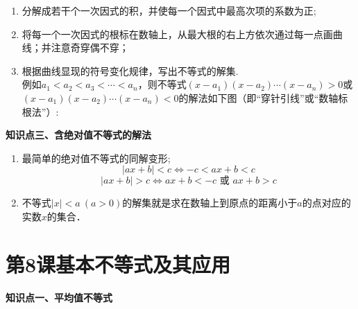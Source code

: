 \documentclass[10pt,a4paper]{ctexbook}
\begin{document}
\begin{enumerate}
    \item 分解成若干个一次因式的积，并使每一个因式中最高次项的系数为正;
    \item 将每一个一次因式的根标在数轴上，从最大根的右上方依次通过每一点画曲线；并注意奇穿偶不穿；
    \item 根据曲线显现的符号变化规律，写出不等式的解集.\\ 
    例如$a_1<a_2<a_3<\cdots <a_n$，则不等式$(x-a_1)(x-a_2)\cdots(x-a_n)>0$或$(x-a_1)(x-a_2)\cdots(x-a_n)<0$的解法如下图（即“穿针引线”或“数轴标根法”）:\par
    \begin{center}
\end{center}

\end{enumerate}

\begin{formal}
    {\large \textbf{知识点三、含绝对值不等式的解法}}
\end{formal}

\begin{enumerate}
    \item 最简单的绝对值不等式的同解变形;
    $$
    |ax+b|<c \Leftrightarrow -c<ax+b<c 
    $$
    $$
    |ax+b|>c \Leftrightarrow ax+b<-c \text{\  或 \ }  ax+b>c
    $$
    \item 不等式$ |x|<a\ (a>0)$的解集就是求在数轴上到原点的距离小于$a$的点对应的实数$x$的集合．

\end{enumerate}
\clearpage
\section{第8课\quad 基本不等式及其应用}

\begin{formal}
    {\large \textbf{知识点一、平均值不等式}}
\end{formal}
\end{document}
